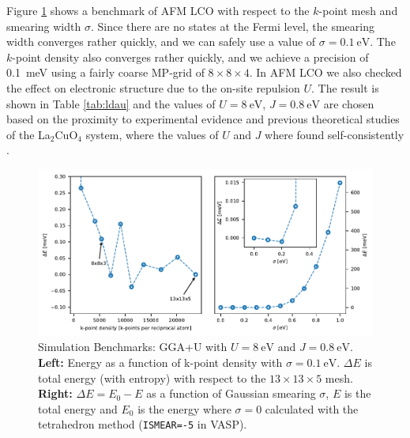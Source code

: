 Figure \ref{fig:sim_bench_afm} shows a benchmark of AFM LCO with respect to the $k$-point mesh and smearing width $\sigma$. Since there are no states at the Fermi level, the smearing width converges rather quickly, and we can safely use a value of $\sigma = \SI{0.1}{\eV}$. The $k$-point density also converges rather quickly, and we achieve a precision of \SI{0.1}{\milli\eV} using a fairly coarse MP-grid of $8\times 8 \times 4$. In AFM LCO we also checked the effect on electronic structure due to the on-site repulsion $U$. The result is shown in Table \ref{tab:ldau} and the values of $U=\SI{8}{\eV}$, $J=\SI{0.8}{\eV}$ are chosen based on the proximity to experimental evidence \cite{Vaknin1987, Uchida1991} and previous theoretical studies of the La$_2$CuO$_4$ system, where the values of $U$ and $J$ where found self-consistently \cite{Anisimov2004,Anisimov1991}.

\begin{figure}
    \centering
    \includegraphics[width=\textwidth]{fig/simulation/convergence_afm.pdf}
    \caption[Simulation Benchmarks: GGA+U]{Simulation Benchmarks: GGA+U with $U=\SI{8}{\eV}$ and $J=\SI{0.8}{\eV}$. \textbf{Left:} Energy as a function of k-point density with $\sigma=\SI{0.1}{\eV}$. $\Delta E$ is total energy (with entropy) with respect to the $13 \times 13 \times 5$ mesh. \textbf{Right:} $\Delta E = E_0 - E$ as a function of Gaussian smearing $\sigma$, $E$ is the total energy and $E_0$ is the energy where $\sigma=0$ calculated with the tetrahedron method (\texttt{ISMEAR=-5} in VASP).}
    \label{fig:sim_bench_afm}
\end{figure}

